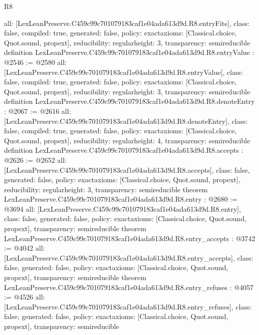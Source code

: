\begin{lexlean}{R8}
\begin{coremodule}
{  all: [LexLeanPreserve.C459c99c701079183caf1e04ada613d9d.R8.entryFits],
  class: false,
  compiled: true,
  generated: false,
  policy: exact{axioms: [Classical.choice, Quot.sound, propext]},
  reducibility: regular{height: 3},
  transparency: semireducible
}
definition LexLeanPreserve.C459c99c701079183caf1e04ada613d9d.R8.entryValue : @2546 := @2580 {
  all: [LexLeanPreserve.C459c99c701079183caf1e04ada613d9d.R8.entryValue],
  class: false,
  compiled: true,
  generated: false,
  policy: exact{axioms: [Classical.choice, Quot.sound, propext]},
  reducibility: regular{height: 3},
  transparency: semireducible
}
definition LexLeanPreserve.C459c99c701079183caf1e04ada613d9d.R8.denoteEntry : @2067 := @2616 {
  all: [LexLeanPreserve.C459c99c701079183caf1e04ada613d9d.R8.denoteEntry],
  class: false,
  compiled: true,
  generated: false,
  policy: exact{axioms: [Classical.choice, Quot.sound, propext]},
  reducibility: regular{height: 4},
  transparency: semireducible
}
definition LexLeanPreserve.C459c99c701079183caf1e04ada613d9d.R8.accepts : @2626 := @2652 {
  all: [LexLeanPreserve.C459c99c701079183caf1e04ada613d9d.R8.accepts],
  class: false,
  generated: false,
  policy: exact{axioms: [Classical.choice, Quot.sound, propext]},
  reducibility: regular{height: 3},
  transparency: semireducible
}
theorem LexLeanPreserve.C459c99c701079183caf1e04ada613d9d.R8.entry : @2680 := @3694 {
  all: [LexLeanPreserve.C459c99c701079183caf1e04ada613d9d.R8.entry],
  class: false,
  generated: false,
  policy: exact{axioms: [Classical.choice, Quot.sound, propext]},
  transparency: semireducible
}
theorem LexLeanPreserve.C459c99c701079183caf1e04ada613d9d.R8.entry_accepts : @3742 := @4042 {
  all: [LexLeanPreserve.C459c99c701079183caf1e04ada613d9d.R8.entry_accepts],
  class: false,
  generated: false,
  policy: exact{axioms: [Classical.choice, Quot.sound, propext]},
  transparency: semireducible
}
theorem LexLeanPreserve.C459c99c701079183caf1e04ada613d9d.R8.entry_refuses : @4057 := @4526 {
  all: [LexLeanPreserve.C459c99c701079183caf1e04ada613d9d.R8.entry_refuses],
  class: false,
  generated: false,
  policy: exact{axioms: [Classical.choice, Quot.sound, propext]},
  transparency: semireducible
}


\end{coremodule}
\end{lexlean}
